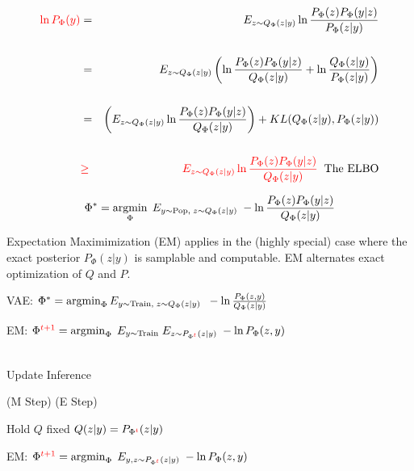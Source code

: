 {{\huge
\begin{eqnarray*}
 {\color{red} \ln P_\Phi(y)} & = & E_{z \sim Q_\Phi(z|y)} \ln \frac{P_\Phi(z)P_\Phi(y|z)}{P_\Phi(z|y)} \\
        \\
 & = & E_{z \sim Q_\Phi(z|y)} \left(\ln \frac{P_\Phi(z)P_\Phi(y|z)}{Q_\Phi(z|y)} + \ln \frac{Q_\Phi(z|y)}{P_\Phi(z|y)}\right) \\
 \\
  & = & \left(E_{z \sim Q_\Phi(z|y)} \ln \frac{P_\Phi(z)P_\Phi(y|z)}{Q_\Phi(z|y)}\right) + KL(Q_\Phi(z|y),P_\Phi(z|y)) \\
  \\
  & {\color{red} \geq} & {\color{red} E_{z \sim Q_\Phi(z|y)} \ln \frac{P_\Phi(z)P_\Phi(y|z)}{Q_\Phi(z|y)}}\;\;\mbox{The ELBO}
\end{eqnarray*}
}



$$\Phi^* = \operatorname*{argmin}_\Phi\; E_{y \sim \mathrm{Pop},\;z \sim Q_\Phi(z|y)}\;-\ln \frac{P_\Phi(z)P_\Phi(y|z)}{Q_\Phi(z|y)}$$


Expectation Maximimization (EM) applies in the (highly special) case where the exact posterior $P_\Phi(z|y)$ is samplable and computable.
EM alternates exact optimization of $Q$ and $P$.

\vfill
VAE: $\Phi^* = \operatorname*{argmin}_\Phi E_{y\sim \mathrm{Train},\;z \sim Q_\Phi(z|y)}\;\;- \ln \frac{P_\Phi(z,y)}{Q_\Phi(z|y)}$

\vfill
EM: $\Phi^{\color{red} t+1} =  \operatorname*{argmin}_\Phi\;E_{y \sim \mathrm{Train}}\;E_{z \sim P_{\Phi^{\color{red} t}}(z|y)}\; - \ln P_\Phi(z,y)$ \\
\\
\centerline{\hspace{1em} Update \hspace{6em} Inference \hspace{2.5em}~}
\centerline{(M Step) \hspace{5em} (E Step) \hspace{1.5em}~}
\centerline{Hold $Q$ fixed \hspace{2.5em} $Q(z|y) = P_{\Phi^{\color{red} t}}(z|y)$ \hspace{0em}~}


EM: $\Phi^{\color{red} t+1} =  \operatorname*{argmin}_\Phi\;E_{y,z \sim P_{\Phi^{\color{red} t}}(z|y)}\; - \ln P_\Phi(z,y)$

}

